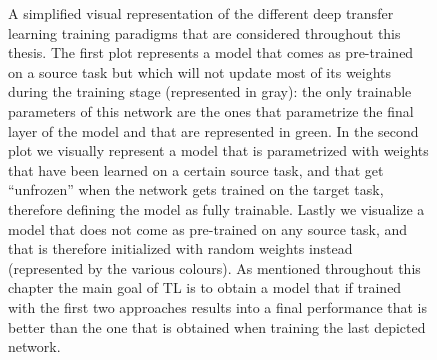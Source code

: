\begin{figure}[!htb]
\endminipage
\caption{A simplified visual representation of the different deep transfer learning training paradigms that are considered throughout this thesis. The first plot represents a model that comes as pre-trained on a source task but which will not update most of its weights during the training stage (represented in gray): the only trainable parameters of this network are the ones that parametrize the final layer of the model and that are represented in green. In the second plot we visually represent a model that is parametrized with weights that have been learned on a certain source task, and that get ``unfrozen'' when the network gets trained on the target task, therefore defining the model as fully trainable. Lastly we visualize a model that does not come as pre-trained on any source task, and that is therefore initialized with random weights instead (represented by the various colours). As mentioned throughout this chapter the main goal of TL is to obtain a model that if trained with the first two approaches results into a final performance that is better than the one that is obtained when training the last depicted network.}
\label{fig:network_training_approaches}
\end{figure}


